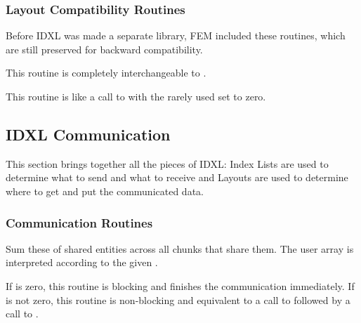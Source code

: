 \subsubsection{Layout Compatibility Routines}

Before IDXL was made a separate library, FEM included these routines,
which are still preserved for backward compatibility.


This routine is completely interchangeable to .



This routine is like a call to  with the rarely
used  set to zero.



\subsection{IDXL Communication}
\label{sec:IDXLComm}
This section brings together all the pieces of IDXL: Index Lists are used to determine what to send and what to receive and Layouts are used to determine where to get and put the communicated data.


\subsubsection{Communication Routines}


Sum these  of shared entities across all chunks that share them.
The user  array is interpreted according to the given .

If  is zero, this routine is blocking and finishes the communication immediately.
If  is not zero, this routine is non-blocking and equivalent to a call to 
 followed by a call to .

